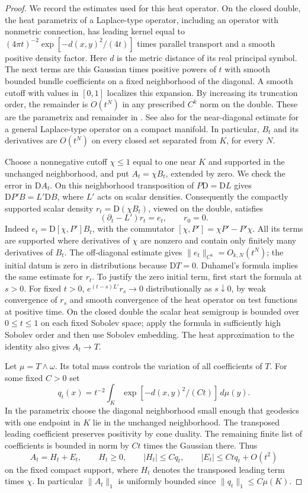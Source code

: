 \documentclass[11pt]{amsart}
\theoremstyle{remark}
\numberwithin{equation}{section}
\newcommand{\D}{\mathrm{D}}
\begin{document}
\begin{proof}
We record the estimates used for this heat operator. On the closed
double, the heat parametrix of a Laplace-type operator, including an
operator with nonmetric connection, has leading kernel equal to
\((4\pi t)^{-2}\exp[-d(x,y)^2/(4t)]\) times parallel transport and a
smooth positive density factor. Here \(d\) is the metric distance
of its real principal symbol. The next terms are this Gaussian
times positive powers of \(t\) with smooth bounded bundle
coefficients on a fixed neighborhood of the diagonal. A smooth
cutoff with values in \([0,1]\) localizes this expansion. By
increasing its truncation order, the remainder is \(O(t^N)\) in
any prescribed \(C^k\) norm on the double. These are the
parametrix and remainder in \cite[Theorem~2.30]{BGV}. See also
\cite[Theorem~3.1]{Ludewig} for the near-diagonal
estimate for a general Laplace-type operator on a compact manifold.
In particular, \(B_t\) and its derivatives are \(O(t^N)\) on every
closed set separated from \(K\), for every \(N\).

Choose a nonnegative cutoff \(\chi\leq1\) equal to one near \(K\)
and supported in the unchanged neighborhood, and put
\(A_t=\chi B_t\), extended by zero. We check the error in
\(\D A_t\). On this neighborhood transposition of \(P\D=\D L\)
gives \(\D P'B=L'\D B\), where \(L'\) acts on scalar densities.
Consequently the compactly supported scalar density
\(r_t=\D(\chi B_t)\), viewed on the double, satisfies
\[
    (\partial_t-L')r_t=e_t,\qquad r_{0}=0.
\]
Indeed \(e_t=\D[\chi,P']B_t\), with the commutator
\([\chi,P']=\chi P'-P'\chi\). All its terms are supported where derivatives of
\(\chi\) are nonzero and contain only finitely many derivatives of
\(B_t\). The off-diagonal estimate gives
\(\|e_t\|_{C^k}=O_{k,N}(t^N)\); the initial datum is zero in
distributions because \(\D T=0\). Duhamel's formula implies the
same estimate for \(r_t\). To justify the zero initial term, first
start the formula at \(s>0\). For fixed \(t>0\),
\(e^{(t-s)L'}r_s\to0\) distributionally as \(s\downarrow0\),
by weak convergence of \(r_s\) and smooth convergence of the heat
operator on test functions at positive time. On the closed double the
scalar heat semigroup is bounded over \(0\leq t\leq1\) on each
fixed Sobolev space; apply the formula in sufficiently high Sobolev
order and then use Sobolev embedding. The heat approximation to
the identity also gives \(A_t\to T\).

Let \(\mu=T\wedge\omega\). Its total mass controls the variation of
all coefficients of \(T\). For some fixed \(C>0\) set
\[
 q_t(x)=t^{-2}\int_K \exp[-d(x,y)^2/(Ct)]\,d\mu(y).
\]
In the parametrix choose the diagonal neighborhood small enough
that geodesics with one endpoint in \(K\) lie in the unchanged
neighborhood. The transposed leading coefficient preserves positivity
by cone duality. The remaining finite list of coefficients is
bounded in norm by \(Ct\) times the Gaussian there. Thus
\[
       A_t=H_t+E_t,\qquad H_t\geq0,\qquad
       |H_t|\leq Cq_t,\qquad |E_t|\leq Ctq_t+O(t^2)
\]
on the fixed compact support, where \(H_t\) denotes the transposed
leading term times \(\chi\). In particular \(\|A_t\|_1\) is
uniformly bounded since \(\|q_t\|_1\leq C\mu(K)\).


\end{proof}
\end{document}

